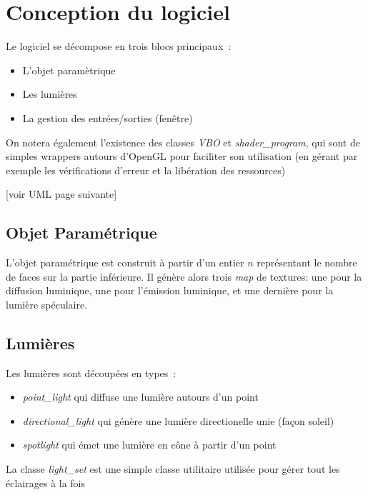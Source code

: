 
\section{Conception du logiciel}

Le logiciel se décompose en trois blocs principaux :
\begin{itemize}
    \item L'objet paramètrique
    \item Les lumières
    \item La gestion des entrées/sorties (fenêtre)
\end{itemize}

On notera également l'existence des classes \textit{VBO} et \textit{shader\_program}, qui sont de
simples wrappers autours d'OpenGL pour faciliter son utilisation (en gérant par exemple
les vérifications d'erreur et la libération des ressources)

[voir UML page suivante]

\begin{landscape}
    \thispagestyle{empty}
    \begin{figure}[h]
        \centering
    \end{figure}
\end{landscape}

\subsection{Objet Paramétrique}

L'objet paramétrique est construit à partir d'un entier \(n\) représentant le nombre de faces sur la partie inférieure. Il génère alors
trois \textit{map} de textures: une pour la diffusion luminique, une pour l'émission luminique, et une dernière pour la lumière spéculaire.

\subsection{Lumières}

Les lumières sont découpées en types :
\begin{itemize}
    \item \textit{point\_light} qui diffuse une lumière autours d'un point
    \item \textit{directional\_light} qui génère une lumière directionelle unie (façon soleil)
    \item \textit{spotlight} qui émet une lumière en cône à partir d'un point
\end{itemize}
La classe \textit{light\_set} est une simple classe utilitaire utilisée pour gérer tout les éclairages à la fois

